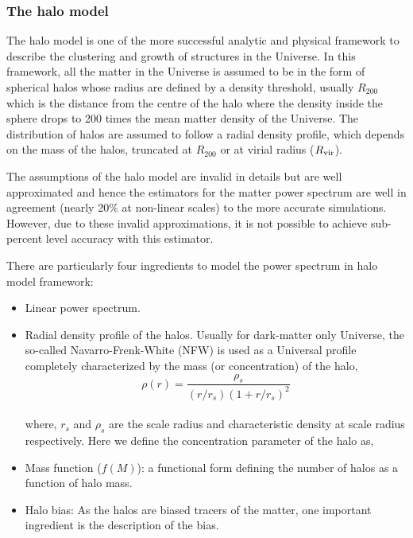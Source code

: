 \subsubsection{The halo model}

The halo model is one of the more successful analytic and physical framework to describe
the clustering and growth of structures in the Universe. In this framework, all the matter
in the Universe is assumed to be in the form of spherical halos whose radius are defined by a 
density threshold, usually $R_{200}$ which is the distance from the centre of the halo where
the density inside the sphere drops to 200 times the mean matter density of the Universe. 
The  distribution of halos are assumed to follow a radial density 
profile, which depends on the mass of the halos, truncated at $R_{200}$ or at virial 
radius ($R_{\rm vir}$).

The assumptions of the halo model are invalid in details but are well approximated and 
hence the estimators for the matter power spectrum are well in agreement 
(nearly 20$\%$ at non-linear scales)
to the more accurate simulations. However, due to these invalid approximations, it is not
possible to achieve sub-percent level accuracy with this estimator. 

There are particularly four ingredients to model the power spectrum in halo model framework:

\begin{itemize}
	\item Linear power spectrum.

	\item Radial density profile of the halos. Usually for dark-matter only Universe, the so-called
			Navarro-Frenk-White (NFW) is used as a Universal profile completely characterized by the
			mass (or concentration) of the halo,
			\begin{equation}
				\rho(r) = \dfrac{\rho_s}{(r/r_s)(1+r/r_s)^2}
			\end{equation}
			\\
			where, $r_s$ and $\rho_s$ are the scale radius and characteristic density at scale radius
			respectively. Here we define the concentration parameter of the halo as,

	\item Mass function ($f(M)$): a functional form defining the number of halos as a function of halo
			mass. 

	\item Halo bias: As the halos are biased tracers of the matter, one important ingredient is 
			the description of the bias.  
\end{itemize}

